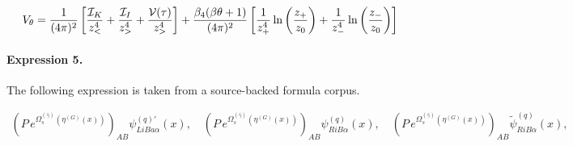 \documentclass[11pt]{article}
\begin{document}
\begin{align*} V_\theta={1\over (4\pi)^2} \left[{{\cal I}_ K \over z_<^4}+ {{\cal I}_I\over z_>^4} + {{\cal V}(\tau)\over z_>^4}\right] + {\beta_4 (\beta\theta +1) \over (4\pi)^{2}} \left[{1\over z_+^4} \ln\left({z_+\over z_0}\right) +{1\over z_-^4 } \ln\left({z_-\over z_0}\right)\right]\end{align*}

\paragraph{Expression 5.} The following expression is taken from a source-backed formula corpus.

\begin{align*}(P\, e^{\Omega_s^{(\hat \gamma )}(\eta^{(G)}(x))} )_{AB} \psi^{(q){'}}_{LiBa\alpha}(x),\quad (P\, e^{\Omega_s^{(\hat \gamma )}(\eta^{(G)}(x))} )_{AB} \psi^{(q)}_{RiB\alpha}(x),\quad (P\, e^{\Omega_s^{(\hat \gamma )}(\eta^{(G)}(x))} )_{AB} {\tilde \psi}^{(q)}_{RiB\alpha}(x),\end{align*}
\end{document}

